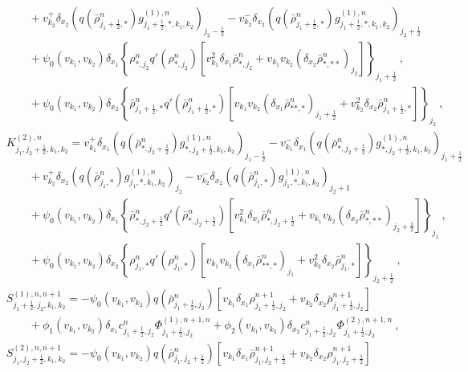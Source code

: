 \documentclass{aims} %
\theoremstyle{definition}
\begin{document}
{\begin{align*}
    & \qquad + v_{k_2}^+\delta_{x_2}(q( {\bar{\rho}}_{j_1+\frac12,*}^n) g_{j_1+\frac12, *,k_1,k_2}^{(1),n})_{j_2-\frac12} - v_{k_2}^-\delta_{x_2}(q( {\bar{\rho}}_{j_1+\frac12,*}^n) g_{j_1+\frac12,*,k_1,k_2}^{(1),n})_{j_2+\frac12} \\
    &\qquad + \psi_{0}(v_{k_1}, v_{k_2})\delta_{x_1}\left\{ {\rho}_{*,j_2}^n q'( {\rho}_{*,j_2}^n)\left[v_{k_1}^2\delta_{x_1}\bar{\rho}_{*,j_2}^n + v_{k_1}v_{k_2}(\delta_{x_2}\bar{\rho}_{*,**}^n)_{j_2} \right]\right\}_{j_1+\frac12}\ , \\
    &\qquad + \psi_{0}(v_{k_1}, v_{k_2})\delta_{x_2}\left\{ {\bar{\rho}}_{j_1+\frac12,*}^n q'( {\bar{\rho}}_{j_1+\frac12,*}^n)\left[v_{k_1}v_{k_2}(\delta_{x_1}\bar{\rho}_{**,*}^n)_{j_1+\frac12} + v_{k_2}^2 \delta_{x_2}\bar{\rho}_{j_1+\frac12,*}^n\right]\right\}_{j_2}\ , \\
    & K_{j_1,j_2+\frac12,k_1, k_2}^{(2),n}  = v_{k_1}^+\delta_{x_1}(q( {\bar{\rho}}_{*,j_2+\frac12}^n) g_{*,j_2+\frac12,k_1,k_2}^{(1),n})_{j_1-\frac12} - v_{k_1}^-\delta_{x_1}(q( {\bar{\rho}}_{*,j_2+\frac12}^n) g_{*,j_2+\frac12,k_1,k_2}^{(1),n})_{j_1+\frac12}\\
    & \qquad + v_{k_2}^+\delta_{x_2}(q( {\bar{\rho}}_{j_1,*}^n) g_{j_1, *,k_1,k_2}^{(1),n})_{j_2} - v_{k_2}^-\delta_{x_2}(q( {\bar{\rho}}_{j_1,*}^n) g_{j_1,*,k_1,k_2}^{(1),n})_{j_2+1} \\
    &\qquad + \psi_{0}(v_{k_1}, v_{k_2})\delta_{x_1}\left\{ {\bar{\rho}}_{*,j_2+\frac12}^n q'( {\bar{\rho}}_{*,j_2+\frac12}^n)\left[v_{k_1}^2\delta_{x_1}\bar{\rho}_{*,j_2+\frac12}^n + v_{k_1}v_{k_2}(\delta_{x_2}\bar{\rho}_{*,**}^n)_{j_2+\frac12} \right]\right\}_{j_1}\ , \\
    &\qquad + \psi_{0}(v_{k_1}, v_{k_2})\delta_{x_2}\left\{ {\rho}_{j_1,*}^n q'( {\rho}_{j_1,*}^n)\left[v_{k_1}v_{k_2}(\delta_{x_1}\bar{\rho}_{**,*}^n)_{j_1} + v_{k_2}^2 \delta_{x_2}\bar{\rho}_{j_1,*}^n \right]\right\}_{j_2+\frac12}\ , \\
    & S_{j_1+\frac12, j_2, k_1, k_2}^{(1), n, n+1} = -\psi_{0}(v_{k_1}, v_{k_2})q( \bar{{\rho}}_{j_1+\frac12,j_2}^n)  \left[v_{k_1} \delta_{x_1} \rho_{j_1+\frac12, j_2}^{n+1} + v_{k_2} \delta_{x_2} \bar{\rho}_{j_1+\frac12, j_2}^{n+1} \right] \\
    & \qquad  + \phi_{1}(v_{k_1}, v_{k_2})\delta_{x_1} c_{j_1+\frac12,j_2}^n \Phi^{(1),n+1,n}_{j_1+\frac12,j_2}+\phi_{2}(v_{k_1}, v_{k_2}) \delta_{x_2} c_{j_1+\frac12,j_2}^n
    \Phi^{(2),n+1,n}_{j_1+\frac12,j_2}
    \ ,\\
    & S_{j_1, j_2+\frac12, k_1, k_2}^{(2), n, n+1} = -\psi_{0}(v_{k_1}, v_{k_2})q( \bar{{\rho}}_{j_1,j_2+\frac12}^n)  \left[v_{k_1} \delta_{x_1} \bar{\rho}_{j_1, j_2+\frac12}^{n+1} + v_{k_2} \delta_{x_2} \rho_{j_1, j_2+\frac12}^{n+1} \right] \\

\end{align*}}
\end{document}
